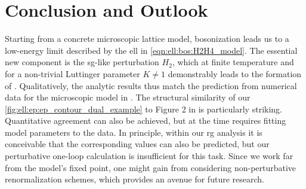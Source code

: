 \chapter{Conclusion and Outlook}\label{chap:sum}
Starting from a concrete microscopic lattice model, bosonization leads us to a low-energy limit described by the \gls{ell} in \autoref{eqn:ell:bos:H2H4_model}.
The essential new component is the \gls{sg}-like perturbation $H_2$, which at finite temperature and for a non-trivial Luttinger parameter $K\neq 1$ demonstrably leads to the formation of .
Qualitatively, the analytic results thus match the prediction from numerical data for the microscopic model in \cite{EP_DynamicInduced_Quenched_Lehmann_2021}.
The structural similarity of our \autoref{fig:ell:ep:ep_contour_dual_example} to Figure 2 in \cite{EP_DynamicInduced_Quenched_Lehmann_2021} is particularly striking.\\
Quantitative agreement can also be achieved, but at the time requires fitting model parameters to the data.
In principle, within our \gls{rg} analysis it is conceivable that the corresponding values can also be predicted, but our perturbative one-loop calculation is insufficient for this task.
Since we work far from the model's fixed point, one might gain from considering non-perturbative renormalization schemes, which provides an avenue for future research.\\
